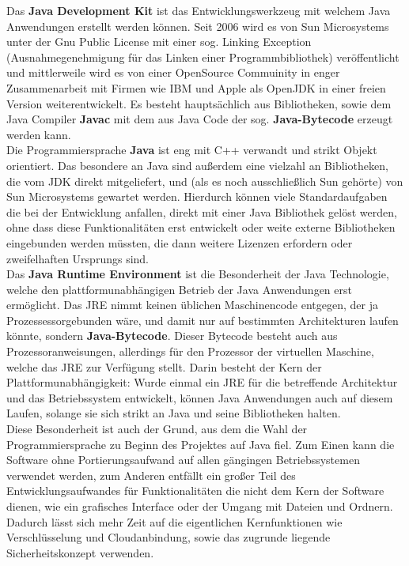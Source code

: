 \documentclass[12pt,a4paper,bibliography=totocnumbered,listof=totocnumbered]{scrartcl}
\begin{document}
Das \textbf{Java Development Kit} ist das Entwicklungswerkzeug mit welchem Java Anwendungen erstellt werden können. Seit 2006 wird es von Sun Microsystems unter der Gnu Public License mit einer sog. Linking Exception (Ausnahmegenehmigung für das Linken einer Programmbibliothek) veröffentlicht und mittlerweile wird es von einer OpenSource Commuinity in enger Zusammenarbeit mit Firmen wie IBM und Apple als OpenJDK in einer freien Version weiterentwickelt. Es besteht hauptsächlich aus Bibliotheken, sowie dem Java Compiler \textbf{Javac} mit dem aus Java Code der sog. \textbf{Java-Bytecode} erzeugt werden kann.\\
Die Programmiersprache \textbf{Java} ist eng mit C++ verwandt und strikt Objekt orientiert. Das besondere an Java sind außerdem eine vielzahl an Bibliotheken, die vom JDK direkt mitgeliefert, und (als es noch ausschließlich Sun gehörte) von Sun Microsystems gewartet werden. Hierdurch können viele Standardaufgaben die bei der Entwicklung anfallen, direkt mit einer Java Bibliothek gelöst werden, ohne dass diese Funktionalitäten erst entwickelt oder weite externe Bibliotheken eingebunden werden müssten, die dann weitere Lizenzen erfordern oder zweifelhaften Ursprungs sind.\\
Das \textbf{Java Runtime Environment} ist die Besonderheit der Java Technologie, welche den plattformunabhängigen Betrieb der Java Anwendungen erst ermöglicht. Das  JRE nimmt keinen üblichen Maschinencode entgegen, der ja Prozessessorgebunden wäre, und damit nur auf bestimmten Architekturen laufen könnte, sondern \textbf{Java-Bytecode}. Dieser Bytecode besteht auch aus Prozessoranweisungen, allerdings für den Prozessor der virtuellen Maschine, welche das JRE zur Verfügung stellt. Darin besteht der Kern der Plattformunabhängigkeit: Wurde einmal ein JRE für die betreffende Architektur und das Betriebssystem entwickelt, können Java Anwendungen auch auf diesem Laufen, solange sie sich strikt an Java und seine Bibliotheken halten.\\
Diese Besonderheit ist auch der Grund, aus dem die Wahl der Programmiersprache zu Beginn des Projektes auf Java fiel. Zum Einen kann die Software ohne Portierungsaufwand auf allen gängingen Betriebssystemen verwendet werden, zum Anderen entfällt ein großer Teil des Entwicklungsaufwandes für Funktionalitäten die nicht dem Kern der Software dienen, wie ein grafisches Interface oder der Umgang mit Dateien und Ordnern. Dadurch lässt sich mehr Zeit auf die eigentlichen Kernfunktionen wie Verschlüsselung und Cloudanbindung,  sowie das zugrunde liegende Sicherheitskonzept verwenden.\cite{1}\cite{2}\\\cite{3}
\end{document}
